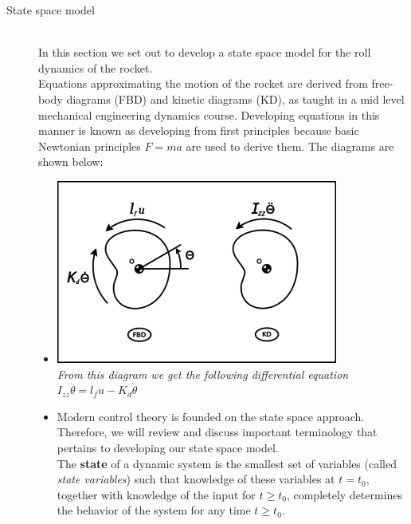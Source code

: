 \documentclass[12pt]{article}
\begin{document}
\begin{description} 
	\item[State space model] \hfill \\
		In this section we set out to develop a state space model for the roll dynamics of the rocket. \\

		Equations approximating the motion of the rocket are derived from free-body diagrams (FBD) and kinetic diagrams (KD), as taught in a mid level mechanical engineering dynamics course. Developing equations in this manner is known as developing from first principles because basic Newtonian principles $F=ma$ are used to derive them. \cite{PSAS} The diagrams are shown below:\\
		\begin{itemize}
			\item[] \includegraphics[scale=.5]{350x250-RollFBD.png} \\
			
				\textit{From this diagram we get the following differential equation}\\
				\textit{$I_{zz}\ddot{\theta} = l_{f}u - K_{d}\dot{\theta}$} \cite{PSAS} \\
				
			\newpage
			\item[] Modern control theory is founded on the state space approach. Therefore, we will review and discuss important terminology that pertains to developing our state space model. \\
			 
			 The \textbf{state} of a dynamic system is the smallest set of variables (called \textit{state variables}) such that knowledge of these variables at $t = t_{0}$, together with knowledge of the input for $ t \geq t_{0}$, completely determines the behavior of the system for any time $t \geq t_{0}$. \cite{MCE}\\
			

\end{itemize}
\end{description}
\end{document}
